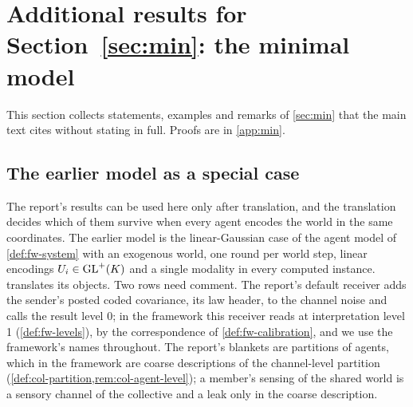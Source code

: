 \section{Additional results for \texorpdfstring{Section~\ref{sec:min}}{Section 9}: the minimal model}\label{sup:min}

This section collects statements, examples and remarks of \cref{sec:min} that the main text cites without stating in full. Proofs are in \cref{app:min}.

\subsection{The earlier model as a special case}\label{sec:min-dictionary}

The report's results can be used here only after translation, and the translation decides which of them survive when every agent encodes the world in the same coordinates. The earlier model is the linear-Gaussian case of the agent model of \cref{def:fw-system} with an exogenous world, one round per world step, linear encodings $U_i\in\mathrm{GL}^+(K)$ and a single modality in every computed instance.  translates its objects. Two rows need comment. The report's default receiver adds the sender's posted coded covariance, its law header, to the channel noise and calls the result level 0; in the framework this receiver reads at interpretation level 1 (\cref{def:fw-levels}), by the correspondence of \cref{def:fw-calibration}, and we use the framework's names throughout. The report's blankets are partitions of agents, which in the framework are coarse descriptions of the channel-level partition (\cref{def:col-partition,rem:col-agent-level}); a member's sensing of the shared world is a sensory channel of the collective and a leak only in the coarse description.

